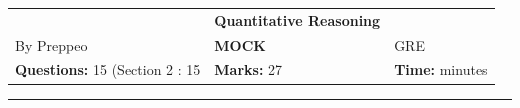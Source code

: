 \documentclass[11pt,paper=a4,answers]{exam}
\begin{document}
\begin{center}
    \centering
    \renewcommand{\arraystretch}{1.5}
    \begin{tabularx}{\textwidth}{YYY}
    & \normalsize\bf{{\Large{{Quantitative Reasoning}}}} & \\
    By Preppeo & \normalsize\bf{MOCK } & GRE\\
    \normalsize{\textbf{Questions:} 15 (Section 2 : 15} & \normalsize{\textbf{Marks:} 27 } & \normalsize{\textbf{Time:}  minutes } \\
    \end{tabularx}
\end{center}
\par\noindent\rule{\textwidth}{1pt}
\end{document}
